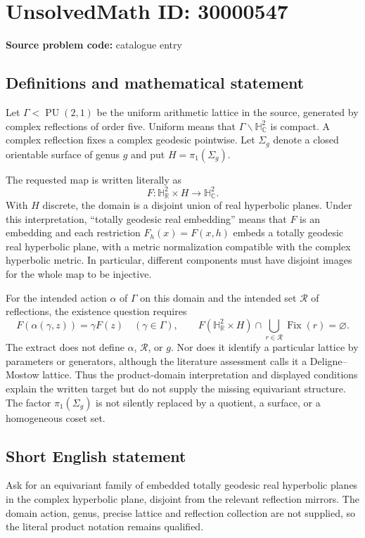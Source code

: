 \documentclass[11pt]{article}
\newcommand{\R}{\mathbb{R}}
\newcommand{\C}{\mathbb{C}}
\begin{document}
\section*{UnsolvedMath ID: 30000547}
\textbf{Source problem code:} catalogue entry
\subsection{Definitions and mathematical statement}
Let $\Gamma<\operatorname{PU}(2,1)$ be the uniform arithmetic lattice in the source, generated by complex reflections of order five. Uniform means that $\Gamma\backslash\mathbb H^2_{\C}$ is compact. A complex reflection fixes a complex geodesic pointwise. Let $\Sigma_g$ denote a closed orientable surface of genus $g$ and put $H=\pi_1(\Sigma_g)$.

The requested map is written literally as
\[
F:\mathbb H^2_{\R}\times H\longrightarrow\mathbb H^2_{\C}.
\]
With $H$ discrete, the domain is a disjoint union of real hyperbolic planes. Under this interpretation, ``totally geodesic real embedding'' means that $F$ is an embedding and each restriction $F_h(x)=F(x,h)$ embeds a totally geodesic real hyperbolic plane, with a metric normalization compatible with the complex hyperbolic metric. In particular, different components must have disjoint images for the whole map to be injective.

For the intended action $\alpha$ of $\Gamma$ on this domain and the intended set $\mathcal R$ of reflections, the existence question requires
\[
F(\alpha(\gamma,z))=\gamma F(z)
\quad(\gamma\in\Gamma),\qquad
F(\mathbb H^2_{\R}\times H)\cap
\bigcup_{r\in\mathcal R}\operatorname{Fix}(r)=\varnothing.
\]
The extract does not define $\alpha$, $\mathcal R$, or $g$. Nor does it identify a particular lattice by parameters or generators, although the literature assessment calls it a Deligne--Mostow lattice. Thus the product-domain interpretation and displayed conditions explain the written target but do not supply the missing equivariant structure. The factor $\pi_1(\Sigma_g)$ is not silently replaced by a quotient, a surface, or a homogeneous coset set.
\subsection{Short English statement}
Ask for an equivariant family of embedded totally geodesic real hyperbolic planes in the complex hyperbolic plane, disjoint from the relevant reflection mirrors. The domain action, genus, precise lattice and reflection collection are not supplied, so the literal product notation remains qualified.
\end{document}
